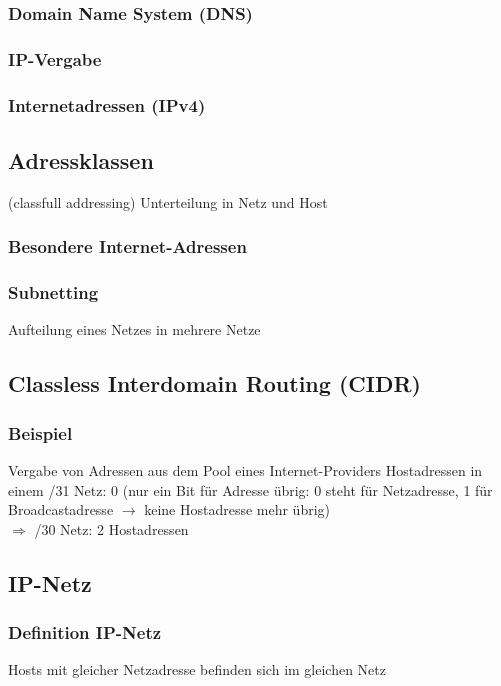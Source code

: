 \subsubsection{Domain Name System (DNS)}

\subsubsection{IP-Vergabe}

\subsubsection{Internetadressen (IPv4)}
\subsection{Adressklassen}
(classfull addressing) Unterteilung in Netz und Host

\subsubsection{Besondere Internet-Adressen}
\subsubsection{Subnetting}
Aufteilung eines Netzes in mehrere Netze
\subsection{Classless Interdomain Routing (CIDR)}
\subsubsection*{Beispiel}
Vergabe von Adressen aus dem Pool eines Internet-Providers
Hostadressen in einem /31 Netz: 0 (nur ein Bit für Adresse übrig: 0 steht für Netzadresse, 1 für Broadcastadresse $\to$ keine Hostadresse mehr übrig)\\
$\Rightarrow$ /30 Netz: 2 Hostadressen
\subsection{IP-Netz}
\subsubsection{Definition IP-Netz}
Hosts mit gleicher Netzadresse befinden sich im gleichen Netz
